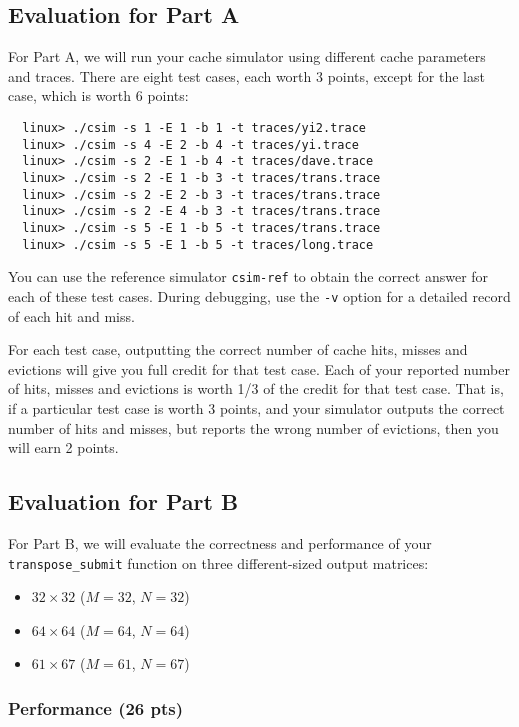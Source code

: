 \documentclass[11pt]{article}
\begin{document}
\subsection{Evaluation for Part A}
For Part A, we will run your cache simulator using different cache
parameters and traces.  There are eight test cases, each worth 3
points, except for the last case, which is worth 6 points:
\begin{verbatim}
  linux> ./csim -s 1 -E 1 -b 1 -t traces/yi2.trace
  linux> ./csim -s 4 -E 2 -b 4 -t traces/yi.trace
  linux> ./csim -s 2 -E 1 -b 4 -t traces/dave.trace
  linux> ./csim -s 2 -E 1 -b 3 -t traces/trans.trace
  linux> ./csim -s 2 -E 2 -b 3 -t traces/trans.trace
  linux> ./csim -s 2 -E 4 -b 3 -t traces/trans.trace
  linux> ./csim -s 5 -E 1 -b 5 -t traces/trans.trace
  linux> ./csim -s 5 -E 1 -b 5 -t traces/long.trace
\end{verbatim}
You can use the reference simulator \verb:csim-ref: to obtain the
correct answer for each of these test cases.  During debugging, use
the {\tt -v} option for a detailed record of each hit and miss.

For each test case, outputting the correct number of cache hits,
misses and evictions will give you full credit for that test case.
Each of your reported number of hits, misses and evictions is worth
1/3 of the credit for that test case.  That is, if a particular test
case is worth 3 points, and your simulator outputs the correct number
of hits and misses, but reports the wrong number of evictions, then
you will earn 2 points.

\subsection{Evaluation for Part B} 

For Part B, we will evaluate the correctness and performance of your
 \verb:transpose_submit: function on three different-sized output matrices:
\begin{itemize}
\item $32 \times 32$ ($M=32$, $N=32$)
\item $64 \times 64$ ($M=64$, $N=64$)
\item $61 \times 67$ ($M=61$, $N=67$) 
\end{itemize}


\subsubsection{Performance (26 pts)}
\end{document}
